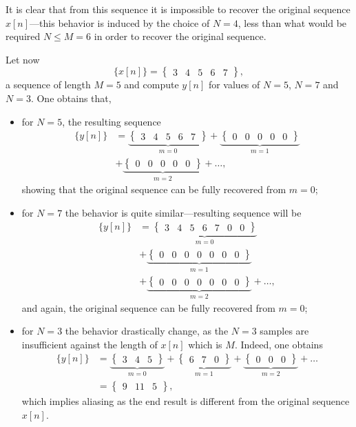 \documentclass[\documentfontsize, twocolumn]{\classname}
\begin{document}
It is clear that from this sequence it is impossible to recover the original sequence $x[n]$---this behavior is induced by the choice of $N=4$, less than what would be required $N\leq M = 6$ in order to recover the original sequence.

Let now 
\[
    \{x[n]\} = \begin{Bmatrix} 3 & 4&  5&  6&  7\end{Bmatrix},
\]
a sequence of length $M=5$ and compute $y[n]$ for values of $N=5$, $N=7$ and $N=3$. One obtains that,
\begin{itemize}
    \item for $N=5$, the resulting sequence \begin{align*}\{y[n]\} &= \underbrace{\begin{Bmatrix} 3 & 4 & 5 & 6 & 7\end{Bmatrix}}_{m = 0} + \underbrace{\begin{Bmatrix} 0 & 0 & 0 & 0 & 0 \end{Bmatrix}}_{m=1}\\ &+ \underbrace{\begin{Bmatrix} 0 & 0 & 0 & 0 & 0 \end{Bmatrix}}_{m=2} +\dots,\end{align*} showing that the original sequence can be fully recovered from $m=0$;
    \item for $N=7$ the behavior is quite similar---resulting sequence will be \begin{align*}\{y[n]\} &= \underbrace{\begin{Bmatrix} 3 & 4 & 5 & 6 & 7 & 0 & 0\end{Bmatrix}}_{m = 0}\\ &+ \underbrace{\begin{Bmatrix} 0 & 0 & 0 & 0 & 0 & 0 & 0 \end{Bmatrix}}_{m=1}\\ &+ \underbrace{\begin{Bmatrix} 0 & 0 & 0 & 0 & 0 & 0 & 0 \end{Bmatrix}}_{m=2} +\dots,\end{align*} and again, the original sequence can be fully recovered from $m=0$;
    \item for $N=3$ the behavior drastically change, as the $N=3$ samples are insufficient against the length of $x[n]$ which is $M$. Indeed, one obtains \begin{align*} \{y[n]\} &= \underbrace{\begin{Bmatrix} 3 & 4 & 5\end{Bmatrix}}_{m=0} + \underbrace{\begin{Bmatrix} 6 & 7 & 0\end{Bmatrix}}_{m=1} + \underbrace{\begin{Bmatrix}0 & 0 & 0\end{Bmatrix}}_{m=2} + \dots\\ &= \begin{Bmatrix} 9 & 11 & 5 \end{Bmatrix},\end{align*} which implies aliasing as the end result is different from the original sequence $x[n]$.
\end{itemize}
\end{document}
